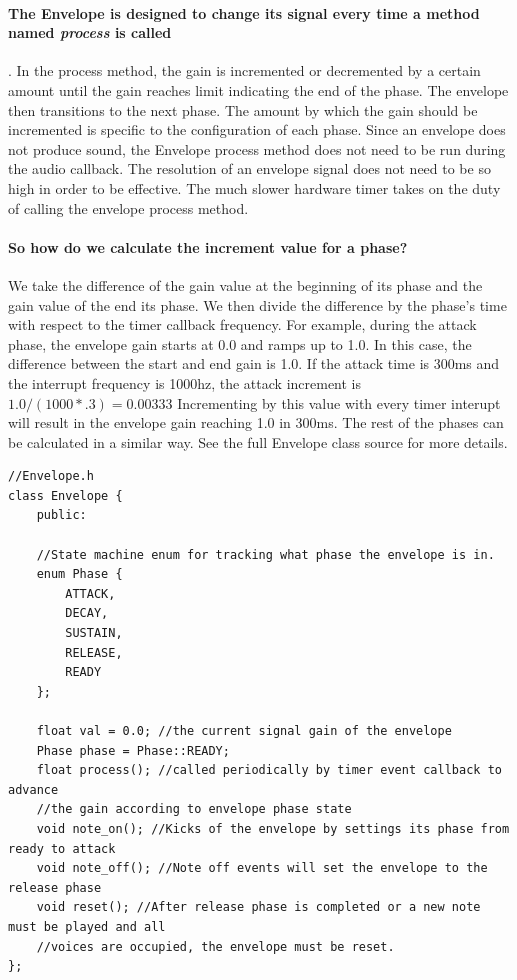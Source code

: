 \documentclass[acmlarge,screen]{acmart}
\begin{document}
	\paragraph{The Envelope is designed to change its signal every time a method named \textit{process} is called}. In the process method, the gain is incremented or decremented by a certain amount until the gain reaches limit indicating the end of the phase. The envelope then transitions to the next phase. The amount by which the gain should be incremented is specific to the configuration of each phase. Since an envelope does not produce sound, the Envelope process method does not need to be run during the audio callback. The resolution of an envelope signal does not need to be so high in order to be effective. The much slower hardware timer takes on the duty of calling the envelope process method.
	
	\paragraph{So how do we calculate the increment value for a phase?} We take the difference of the gain value at the beginning of its phase and the gain value of the end its phase. We then divide the difference by the phase's time with respect to the timer callback frequency. For example, during the attack phase, the envelope gain starts at 0.0 and ramps up to 1.0. In this case, the difference between the start and end gain is 1.0. If the attack time is 300ms and the interrupt frequency is 1000hz, the attack increment is \( 1.0/(1000*.3)=0.00333 \) Incrementing by this value with every timer interupt will result in the envelope gain reaching 1.0 in 300ms. The rest of the phases can be calculated in a similar way. See the full Envelope class source for more details.
	
	\begin{verbatim}
//Envelope.h
class Envelope {
	public:
	
	//State machine enum for tracking what phase the envelope is in.
	enum Phase {
		ATTACK,
		DECAY,
		SUSTAIN,
		RELEASE,
		READY 
	};
	
	float val = 0.0; //the current signal gain of the envelope
	Phase phase = Phase::READY;
	float process(); //called periodically by timer event callback to advance
	//the gain according to envelope phase state
	void note_on(); //Kicks of the envelope by settings its phase from ready to attack
	void note_off(); //Note off events will set the envelope to the release phase
	void reset(); //After release phase is completed or a new note must be played and all
	//voices are occupied, the envelope must be reset.
};
	\end{verbatim}
	
\end{document}
